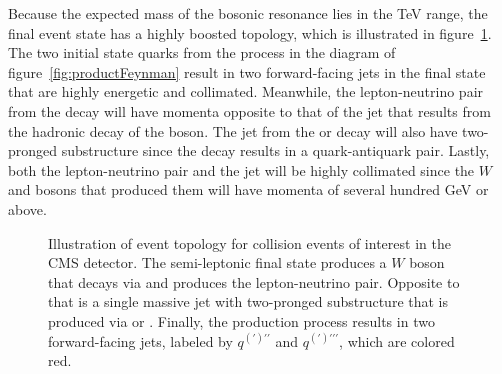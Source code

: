 Because the expected mass of the bosonic resonance lies in the TeV range, the final event state has a highly boosted topology, which is illustrated in figure~\ref{fig:eventTop}.
The two initial state quarks from the \VBF process in the diagram of figure~\ref{fig:productFeynman} result in two forward-facing jets in the final state that are highly energetic and collimated.
Meanwhile, the lepton-neutrino pair from the \Wtolnu decay will have momenta opposite to that of the jet that results from the hadronic decay of the \VorH boson.
The jet from the \Vtoqqbarpr or \Htobbbar decay will also have two-pronged substructure since the decay results in a quark-antiquark pair.
Lastly, both the lepton-neutrino pair and the jet will be highly collimated since the $W$ and \VorH bosons that produced them will have momenta of several hundred GeV or above.

\begin{figure}[htbp]
  \centering
  
  \caption{
    Illustration of event topology for collision events of interest in the CMS detector.
    The semi-leptonic final state produces a $W$ boson that decays via \Wtolnu and produces the lepton-neutrino pair.
    Opposite to that is a single massive jet with two-pronged substructure that is produced via \Vtoqqbarpr or \Htobbbar.
    Finally, the \VBF production process results in two forward-facing jets, labeled by $q^{(\prime)\prime\prime}$ and $q^{(\prime)\prime\prime\prime}$, which are colored red.
  }
  \label{fig:eventTop}
\end{figure}
